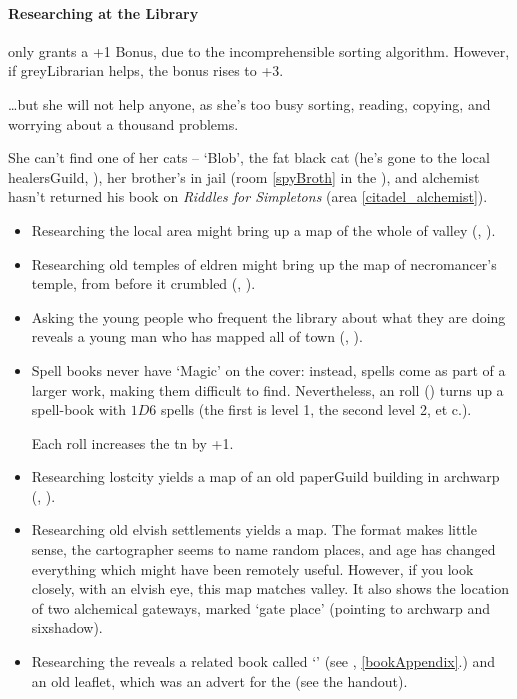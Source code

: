 \begin{multicols}{2}
\paragraph{Researching at the Library}
only grants a +1 Bonus, due to the incomprehensible sorting algorithm.
However, if \gls{greyLibrarian} helps, the bonus rises to +3.

\ldots but she will not help anyone, as she's too busy sorting, reading, copying, and worrying about a thousand problems.

She can't find one of her cats -- `Blob', the fat black cat (he's gone to the local \gls{healersGuild}, ),
her brother's in jail (room  \vref{spyBroth} in the ), and \gls{alchemist} hasn't returned his book on \textit{Riddles for Simpletons} (area \vref{citadel_alchemist}).
\label{paperCat}


\begin{itemize}
  \item
  Researching the local area might bring up a map of the whole of \gls{valley} (, \tn[14]).
  \item
  Researching old temples of \gls{eldren} might bring up the map of \gls{necromancer}'s temple, from before it crumbled (, \tn[10]).
  \item
  Asking the young people who frequent the library about what they are doing reveals a young man who has mapped all of \gls{town} (, \tn[10]).
  \item
  Spell books never have `Magic' on the cover: instead, spells come as part of a larger work, making them difficult to find.
  Nevertheless, an  roll (\tn[9]) turns up a spell-book with $1D6$ spells (the first is level 1, the second level 2, et c.).

  Each roll increases the \gls{tn} by +1.
  \item
  Researching \gls{lostcity} yields a map of an old \gls{paperGuild} building in \gls{archwarp} (, \tn[18]).
  \item
  Researching old elvish settlements yields a map.
  The format makes little sense, the cartographer seems to name random places, and age has changed everything which might have been remotely useful.
  However, if you look closely, with an elvish eye, this map matches \gls{valley}.
  It also shows the location of two alchemical gateways, marked `gate place' (pointing to \gls{archwarp} and \gls{sixshadow}).
  \item
  Researching the  reveals a related book called `' (see , \autoref{bookAppendix}.) and an old leaflet, which was an advert for the  (see the handout).
\end{itemize}


\end{multicols}
